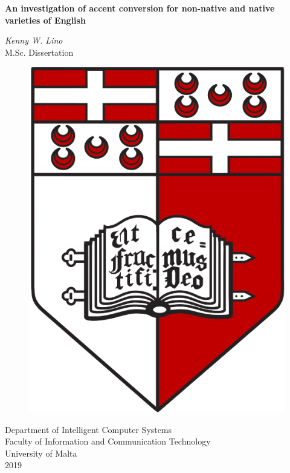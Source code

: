 \documentclass
[
    a4paper,
    twoside,
    12pt,
]
{report}
\begin{document}
\begin{titlepage}
    \vspace*{1.0cm}
    \begin{center}
        \begin{Large}
        \textbf{An investigation of accent conversion for non-native and native varieties of English} \\
        \end{Large}
        \vspace*{1.0cm}
        \textit{Kenny W. Lino} \\
        \vspace*{1.5cm}
        M.Sc. Dissertation \\
        \vspace*{0.5cm}
        \begin{figure}[H]
        \centering
        \includegraphics[scale=0.15]{img/UM-coat-of-arms.png}
    	\end{figure}
       \vspace*{1.0cm}
       Department of Intelligent Computer Systems \\
       Faculty of Information and Communication Technology \\
       University of Malta \\
       2019 \\
       

\end{center}
\end{titlepage}
\end{document}
